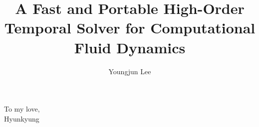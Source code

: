 




\title{A Fast and Portable High-Order Temporal Solver for Computational Fluid Dynamics}
\author{Youngjun Lee}
\deanlinethree{}

\begin{frontmatter}
\maketitle

\copyrightpage

\tableofcontents

\listoffigures

\listoftables

\begin{abstract}

\end{abstract}

\begin{dedication}
\vspace*{\fill}
\begin{center}
    To my love, \\ Hyunkyung
\end{center}
\vspace*{\fill}
\end{dedication}

\begin{acknowledgements}

\end{acknowledgements}

\end{frontmatter}















\nocite{*}

\singlespacing

\doublespacing


